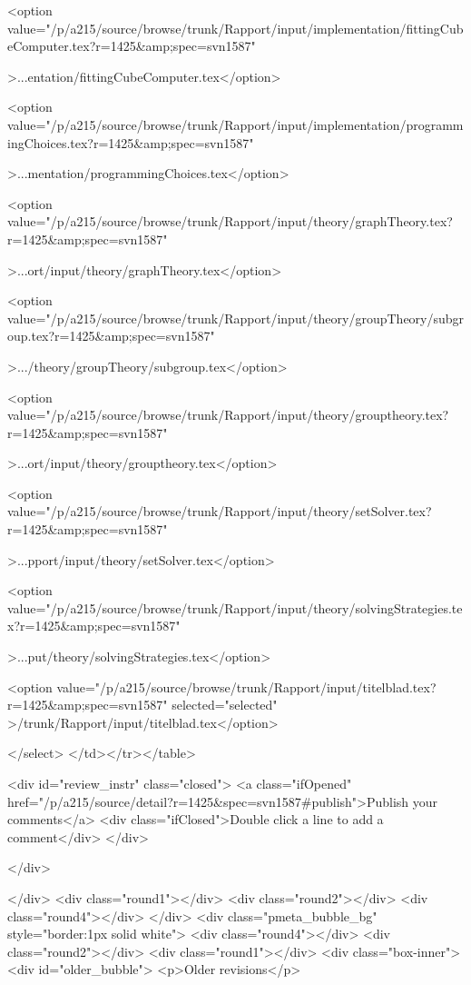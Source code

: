  <option value="/p/a215/source/browse/trunk/Rapport/input/implementation/fittingCubeComputer.tex?r=1425&amp;spec=svn1587"
 
 >...entation/fittingCubeComputer.tex</option>
 
 <option value="/p/a215/source/browse/trunk/Rapport/input/implementation/programmingChoices.tex?r=1425&amp;spec=svn1587"
 
 >...mentation/programmingChoices.tex</option>
 
 <option value="/p/a215/source/browse/trunk/Rapport/input/theory/graphTheory.tex?r=1425&amp;spec=svn1587"
 
 >...ort/input/theory/graphTheory.tex</option>
 
 <option value="/p/a215/source/browse/trunk/Rapport/input/theory/groupTheory/subgroup.tex?r=1425&amp;spec=svn1587"
 
 >.../theory/groupTheory/subgroup.tex</option>
 
 <option value="/p/a215/source/browse/trunk/Rapport/input/theory/grouptheory.tex?r=1425&amp;spec=svn1587"
 
 >...ort/input/theory/grouptheory.tex</option>
 
 <option value="/p/a215/source/browse/trunk/Rapport/input/theory/setSolver.tex?r=1425&amp;spec=svn1587"
 
 >...pport/input/theory/setSolver.tex</option>
 
 <option value="/p/a215/source/browse/trunk/Rapport/input/theory/solvingStrategies.tex?r=1425&amp;spec=svn1587"
 
 >...put/theory/solvingStrategies.tex</option>
 
 <option value="/p/a215/source/browse/trunk/Rapport/input/titelblad.tex?r=1425&amp;spec=svn1587"
 selected="selected"
 >/trunk/Rapport/input/titelblad.tex</option>
 
 </select>
 </td></tr></table>
 
 
 
 <div id="review_instr" class="closed">
 <a class="ifOpened" href="/p/a215/source/detail?r=1425&spec=svn1587#publish">Publish your comments</a>
 <div class="ifClosed">Double click a line to add a comment</div>
 </div>
 
 </div>
 
 
 </div>
 <div class="round1"></div>
 <div class="round2"></div>
 <div class="round4"></div>
 </div>
 <div class="pmeta_bubble_bg" style="border:1px solid white">
 <div class="round4"></div>
 <div class="round2"></div>
 <div class="round1"></div>
 <div class="box-inner">
 <div id="older_bubble">
 <p>Older revisions</p>
 
